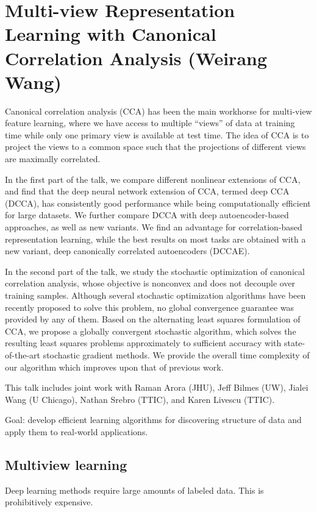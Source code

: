\section{Multi-view Representation Learning with Canonical Correlation Analysis (Weirang Wang)}


Canonical correlation analysis (CCA) has been the main workhorse for
multi-view feature learning, where we have access to multiple
``views'' of data at training time while only one primary view is
available at test time. The idea of CCA is to project the views to a
common space such that the projections of different views are
maximally correlated.

In the first part of the talk, we compare different nonlinear
extensions of CCA, and find that the deep neural network extension of
CCA, termed deep CCA (DCCA), has consistently good performance while
being computationally efficient for large datasets. We further compare
DCCA with deep autoencoder-based approaches, as well as new variants.
We find an advantage for correlation-based representation learning,
while the best results on most tasks are obtained with a new variant,
deep canonically correlated autoencoders (DCCAE).

In the second part of the talk, we study the stochastic optimization
of canonical correlation analysis, whose objective is nonconvex and
does not decouple over training samples. Although several stochastic
optimization algorithms have been recently proposed to solve this
problem, no global convergence guarantee was provided by any of them.
Based on the alternating least squares formulation of CCA, we propose
a globally convergent stochastic algorithm, which solves the resulting
least squares problems approximately to sufficient accuracy with
state-of-the-art stochastic gradient methods. We provide the overall
time complexity of our algorithm which improves upon that of previous
work.

This talk includes joint work with Raman Arora (JHU), Jeff Bilmes
(UW), Jialei Wang (U Chicago), Nathan Srebro (TTIC), and Karen Livescu
(TTIC).

Goal: develop efficient learning algorithms for discovering structure of data and apply them to real-world applications.

\subsection{Multiview learning}

Deep learning methods require large amounts of labeled data. This is prohibitively expensive.

